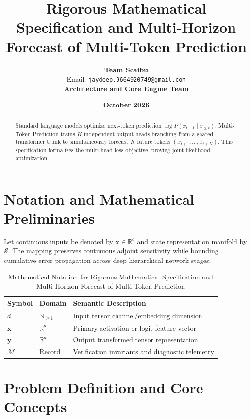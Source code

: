 \documentclass[11pt,a4paper]{article}
\title{\textbf{Rigorous Mathematical Specification and Multi-Horizon Forecast of Multi-Token Prediction}}
\author{\textbf{Team Scaibu} \\ \small Email: \texttt{jaydeep.9664920749@gmail.com} \\ \small \textbf{Architecture and Core Engine Team}}
\date{\textbf{October 2026}}
\theoremstyle{definition}
\begin{document}
\maketitle

\begin{abstract}
Standard language models optimize next-token prediction $\log P(x_{t+1} \mid x_{\le t})$. Multi-Token Prediction trains $K$ independent output heads branching from a shared transformer trunk to simultaneously forecast $K$ future tokens $(x_{t+1}, \dots, x_{t+K})$. This specification formalizes the multi-head loss objective, proving joint likelihood optimization.
\end{abstract}

\section{Notation and Mathematical Preliminaries}

Let continuous inputs be denoted by $\mathbf{x} \in \mathbb{R}^d$ and state representation manifold by $\mathcal{S}$. The mapping preserves continuous adjoint sensitivity while bounding cumulative error propagation across deep hierarchical network stages.

\begin{table}[h]
\centering
\caption{Mathematical Notation for Rigorous Mathematical Specification and Multi-Horizon Forecast of Multi-Token Prediction}
\begin{tabular}{lll}
\toprule
\textbf{Symbol} & \textbf{Domain} & \textbf{Semantic Description} \\
\midrule
$d$ & $\mathbb{N}_{\ge 1}$ & Input tensor channel/embedding dimension \\
$\mathbf{x}$ & $\mathbb{R}^d$ & Primary activation or logit feature vector \\
$\mathbf{y}$ & $\mathbb{R}^d$ & Output transformed tensor representation \\
$\mathcal{M}$ & Record & Verification invariants and diagnostic telemetry \\
\bottomrule
\end{tabular}
\end{table}

\section{Problem Definition and Core Concepts}
\end{document}
